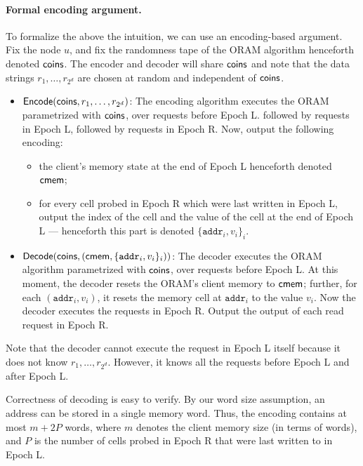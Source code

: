 \paragraph{Formal encoding argument.}
To formalize the above the intuition, we can use an encoding-based argument.
Fix the node $u$, 
and fix the randomness tape
of the ORAM algorithm henceforth denoted ${\sf coins}$.
The encoder and decoder will share ${\sf coins}$
and note that 
the data strings $r_1, \ldots, r_{2^d}$ are chosen at random 
and independent of ${\sf coins}$.


\begin{itemize}[leftmargin=6mm]
\item  ${\sf Encode}({\sf coins}, r_1, \ldots, r_{2^d})$:
The encoding algorithm executes the ORAM parametrized
with ${\sf coins}$, over requests before Epoch L.
followed by requests in Epoch L, 
followed by requests in Epoch R.
Now, output the following encoding:
\begin{itemize}
\item 
the client's memory state at the end of Epoch L henceforth denoted
${\sf cmem}$; 
\item 
for every cell probed 
in Epoch R which were 
last written in Epoch L, output
the index of the cell and 
the value of the cell at the end of Epoch L --- henceforth
this part is denoted $\{\texttt{addr}_i, v_i\}_i$.
\end{itemize}


\item  ${\sf Decode}({\sf coins}, ({\sf cmem}, \{\texttt{addr}_i, v_i\}_i))$:
The decoder executes the ORAM algorithm 
parametrized with ${\sf coins}$, over requests before Epoch L.
At this moment, 
the decoder resets the ORAM's client memory to ${\sf cmem}$;  
further, 
for each $(\texttt{addr}_i, v_i)$, it resets
the memory cell at $\texttt{addr}_i$ to the value $v_i$.
Now the decoder executes the requests in Epoch R.
Output the output of each read request in
Epoch R.
\end{itemize}

Note that the decoder cannot execute the request in Epoch L
itself because it does not know $r_1, \ldots, r_{2^d}$.
However, it knows all the requests before Epoch L and after Epoch L. 


Correctness of decoding is easy to verify. 
By our word size
 assumption, an address can be stored in a single memory word.
Thus, the encoding contains at most  
$m + 2 P$
words, where 
$m$
denotes the client memory size (in terms of words), and 
$P$ is the number 
of cells probed in Epoch R that were 
last written to in Epoch L.

